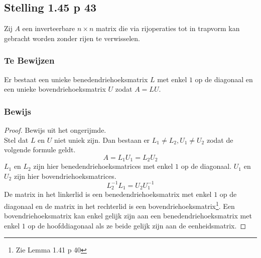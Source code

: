 \documentclass[lineaire_algebra_oplossingen.tex]{subfiles}
\begin{document}
\subsection{Stelling 1.45 p 43}
Zij $A$ een inverteerbare $n\times n$ matrix die via rijoperaties tot in trapvorm kan gebracht worden zonder rijen te verwisselen.
\subsubsection*{Te Bewijzen}
Er bestaat een unieke benedendriehoeksmatrix $L$ met enkel $1$ op de diagonaal en een unieke bovendriehoeksmatrix $U$ zodat $A=LU$.
\subsubsection*{Bewijs}
\begin{proof}
Bewijs uit het ongerijmde.\\
Stel dat $L$ en $U$ niet uniek zijn. Dan bestaan er $L_1 \neq L_2,U_1 \neq U_2$ zodat de volgende formule geldt.
\[
A = L_1U_1=L_2U_2
\]
$L_1$ en $L_2$ zijn hier benedendriehoeksmatrices met enkel $1$ op de diagonaal. $U_1$ en $U_2$ zijn hier bovendriehoeksmatrices.
\[
L_2^{-1}L_1 = U_2U_1^{-1}
\]
De matrix in het linkerlid is een benedendriehoeksmatrix met enkel $1$ op de diagonaal en de matrix in het rechterlid is een bovendriehoeksmatrix\footnote{Zie Lemma 1.41 p 40}.
Een bovendriehoeksmatrix kan enkel gelijk zijn aan een benedendriehoeksmatrix met enkel $1$ op de hoofddiagonaal als ze beide gelijk zijn aan de eenheidsmatrix.
\end{proof}
\end{document}
